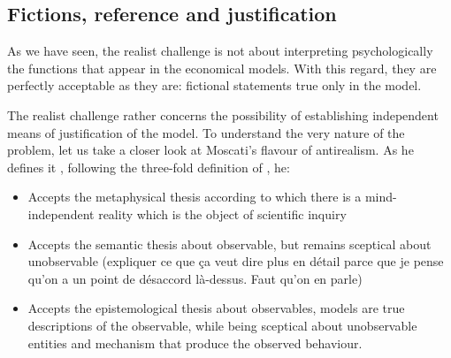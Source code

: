 \documentclass[a4paper,11pt]{article}
\theoremstyle{definition}
\begin{document}
\subsection{Fictions, reference and justification}

As we have seen, the realist challenge is not about interpreting psychologically the functions that appear in the economical models. With this regard, they are perfectly acceptable as they are: fictional statements true only in the model.

The realist challenge rather concerns the possibility of establishing independent means of justification of the model. To understand the very nature of the problem, let us take a closer look at Moscati's flavour of antirealism. As he defines it \citep[pp.~18-20]{Moscati2023}, following the three-fold definition of \citep{Psillos1999}, he:

\begin{itemize}
    \item Accepts the metaphysical thesis according to which there is a mind-independent reality which is the object of scientific inquiry
    \item Accepts the semantic thesis about observable, but remains sceptical about unobservable (expliquer ce que ça veut dire plus en détail parce que je pense qu'on a un point de désaccord là-dessus. Faut qu'on en parle)
    \item Accepts the epistemological thesis about observables, models are true descriptions of the observable, while being sceptical about unobservable entities and mechanism that produce the observed behaviour.
\end{itemize}
\end{document}

